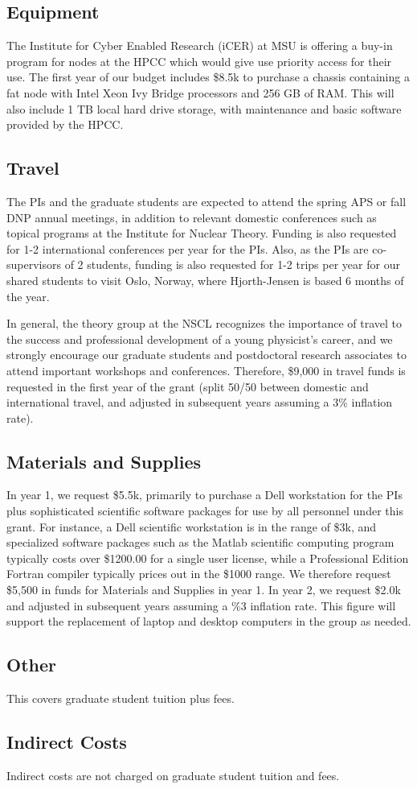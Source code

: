 \subsection{Equipment}
The Institute for Cyber Enabled Research (iCER) at MSU is offering a buy-in program for nodes at the HPCC which would give use priority access for their use. The first year of our budget includes \$8.5k to purchase a chassis containing a fat node with Intel Xeon Ivy Bridge processors and 256 GB of RAM. This will also include 1 TB local hard drive storage, with maintenance and basic software provided by the HPCC.

\subsection{Travel}
The PIs and the graduate students are expected to attend the spring APS or fall DNP annual meetings, in addition to relevant domestic conferences such as topical programs at the Institute for Nuclear Theory. Funding is also requested for 1-2  international conferences per year for the PIs. 
Also, as the PIs are co-supervisors of 2 students, funding is also requested for 1-2 trips per year for our shared students to visit Oslo, Norway, where Hjorth-Jensen is based 6 months of the year. 

In general, the theory group at the NSCL recognizes the importance of travel to the
success and professional development of a young physicist's career, and we strongly encourage our graduate students and postdoctoral research associates to attend important workshops and
conferences.  Therefore, \$9,000 in travel funds is requested in the first year of the grant (split 50/50 between domestic and international travel, and adjusted in subsequent years assuming a 3\% inflation rate).

\subsection{Materials and Supplies}
In year 1, we request \$5.5k, primarily to purchase a Dell workstation for the PIs plus sophisticated scientific software packages for use by all personnel under this grant. For instance, a Dell scientific workstation is in the range of \$3k, and specialized software packages such as the Matlab scientific computing program typically costs over \$1200.00 for a single user license, while a Professional Edition Fortran compiler typically prices out in the \$1000 range. We therefore request \$5,500 in funds for Materials and Supplies in year 1. In year 2, we request \$2.0k and adjusted in subsequent years assuming a \%3 inflation rate. This figure will support the replacement of laptop and desktop computers in the group as needed.

\subsection{Other}
This covers graduate student tuition plus fees.

\subsection{Indirect Costs}
Indirect costs are not charged on graduate student tuition and fees. 


